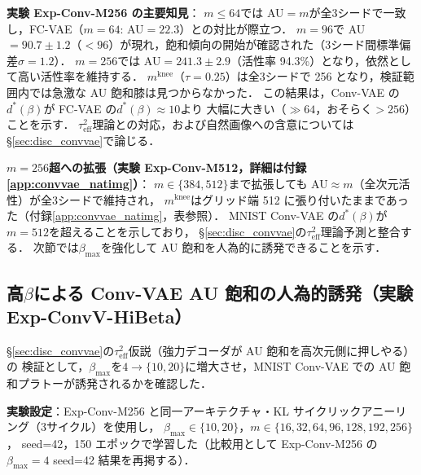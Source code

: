 \documentclass[11pt,a4paper]{jsarticle}
\newcommand{\mknee}{m^{\mathrm{knee}}}
\begin{document}
\textbf{実験 Exp-Conv-M256 の主要知見}：
$m \leq 64$では AU$=m$が全3シードで一致し，FC-VAE（$m=64$: AU$=22.3$）との対比が際立つ．
$m = 96$で AU$=90.7\pm1.2$（$<96$）が現れ，飽和傾向の開始が確認された（3シード間標準偏差$\sigma=1.2$）．
$m=256$では AU$=241.3\pm2.9$（活性率 94.3\%）となり，依然として高い活性率を維持する．
$\mknee$（$\tau=0.25$）は全3シードで 256 となり，検証範囲内では急激な AU 飽和膝は見つからなかった．
この結果は，Conv-VAE の$d^*(\beta)$が FC-VAE の$d^*(\beta) \approx 10$より
大幅に大きい（$\gg 64$，おそらく$> 256$）ことを示す．
$\tau^2_\mathrm{eff}$理論との対応，および自然画像への含意については §\ref{sec:disc_convvae}で論じる．

\textbf{$m=256$超への拡張（実験 Exp-Conv-M512，詳細は付録\ref{app:convvae_natimg}）}：
$m \in \{384, 512\}$まで拡張しても AU$\approx m$（全次元活性）が全3シードで維持され，
$\mknee$はグリッド端 512 に張り付いたままであった（付録\ref{app:convvae_natimg}，表参照）．
MNIST Conv-VAE の$d^*(\beta)$が$m=512$を超えることを示しており，
§\ref{sec:disc_convvae}の$\tau^2_\mathrm{eff}$理論予測と整合する．
次節では$\beta_{\max}$を強化して AU 飽和を人為的に誘発できることを示す．

\subsection{高$\beta$による Conv-VAE AU 飽和の人為的誘発（実験 Exp-ConvV-HiBeta）}\label{sec:exp_hibeta}

§\ref{sec:disc_convvae}の$\tau^2_\mathrm{eff}$仮説（強力デコーダが AU 飽和を高次元側に押しやる）の
検証として，$\beta_{\max}$を$4 \to \{10, 20\}$に増大させ，MNIST Conv-VAE での
AU 飽和プラトーが誘発されるかを確認した．

\textbf{実験設定}：Exp-Conv-M256 と同一アーキテクチャ・KL サイクリックアニーリング（3サイクル）を使用し，
$\beta_{\max} \in \{10, 20\}$，$m \in \{16, 32, 64, 96, 128, 192, 256\}$，
seed=42，150 エポックで学習した（比較用として Exp-Conv-M256 の$\beta_{\max}=4$ seed=42 結果を再掲する）．
\end{document}

